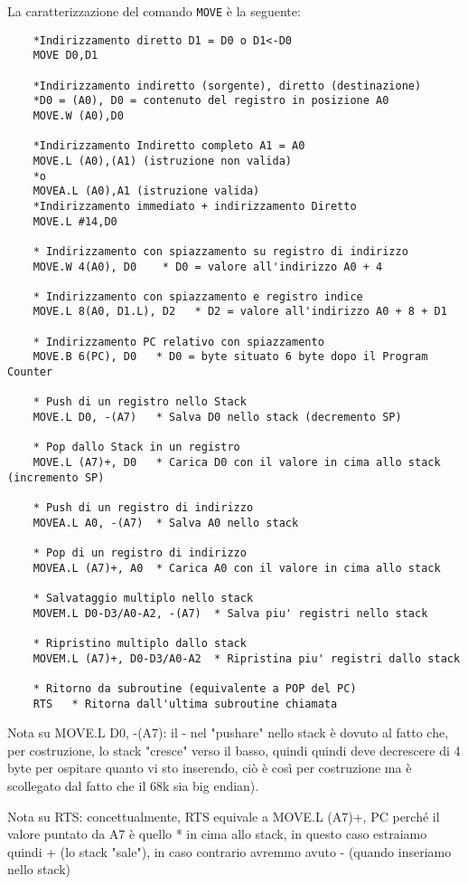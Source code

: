 La caratterizzazione del comando \lstinline|MOVE| è la seguente:
\begin{lstlisting}
    *Indirizzamento diretto D1 = D0 o D1<-D0
    MOVE D0,D1

    *Indirizzamento indiretto (sorgente), diretto (destinazione)
    *D0 = (A0), D0 = contenuto del registro in posizione A0
    MOVE.W (A0),D0

    *Indirizzamento Indiretto completo A1 = A0
    MOVE.L (A0),(A1) (istruzione non valida)
    *o
    MOVEA.L (A0),A1 (istruzione valida)
    *Indirizzamento immediato + indirizzamento Diretto
    MOVE.L #14,D0

    * Indirizzamento con spiazzamento su registro di indirizzo
    MOVE.W 4(A0), D0    * D0 = valore all'indirizzo A0 + 4

    * Indirizzamento con spiazzamento e registro indice
    MOVE.L 8(A0, D1.L), D2   * D2 = valore all'indirizzo A0 + 8 + D1

    * Indirizzamento PC relativo con spiazzamento
    MOVE.B 6(PC), D0   * D0 = byte situato 6 byte dopo il Program Counter

    * Push di un registro nello Stack
    MOVE.L D0, -(A7)   * Salva D0 nello stack (decremento SP)

    * Pop dallo Stack in un registro
    MOVE.L (A7)+, D0   * Carica D0 con il valore in cima allo stack (incremento SP)

    * Push di un registro di indirizzo
    MOVEA.L A0, -(A7)  * Salva A0 nello stack

    * Pop di un registro di indirizzo
    MOVEA.L (A7)+, A0  * Carica A0 con il valore in cima allo stack

    * Salvataggio multiplo nello stack
    MOVEM.L D0-D3/A0-A2, -(A7)  * Salva piu' registri nello stack

    * Ripristino multiplo dallo stack
    MOVEM.L (A7)+, D0-D3/A0-A2  * Ripristina piu' registri dallo stack

    * Ritorno da subroutine (equivalente a POP del PC)
    RTS   * Ritorna dall'ultima subroutine chiamata
\end{lstlisting}

Nota su MOVE.L D0, -(A7): il - nel "pushare" nello stack è dovuto al fatto che, per costruzione, lo stack "cresce" verso il basso, quindi quindi deve decrescere di 4 byte per ospitare quanto vi sto inserendo, ciò è così per costruzione ma è scollegato dal fatto che il 68k sia big endian).

Nota su RTS: concettualmente, RTS equivale a MOVE.L (A7)+, PC perché il valore puntato da A7 è quello * in cima allo stack, in questo caso estraiamo quindi + (lo stack "sale"), in caso contrario avremmo avuto - (quando inseriamo nello stack)

